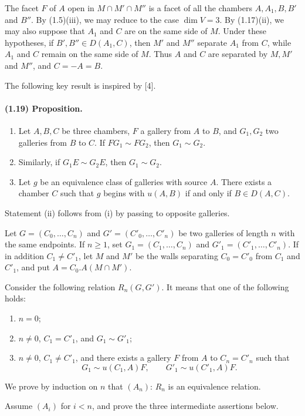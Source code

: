 \documentclass[10pt]{article}
\begin{document}
The facet $F$ of $A$ open in $M\cap M'\cap M''$ is a facet of all the chambers $A,A_1,B,B'$ and $B''$. By (1.5)(iii), we may reduce to the case $\dim V=3$. By (1.17)(ii), we may also suppose that $A_1$ and $C$ are on the same side of $M$. Under these hypotheses, if $B',B''\in D(A_1,C)$, then $M'$ and $M''$ separate $A_1$ from $C$, while $A_1$ and $C$ remain on the same side of $M$. Thus $A$ and $C$ are separated by $M,M'$ and $M''$, and $C=-A=B$.

The following key result is inspired by [4].

\paragraph{(1.19) Proposition.} \begin{enumerate}[label=(\roman*)]
\item Let $A,B,C$ be three chambers, $F$ a gallery from $A$ to $B$, and $G_1,G_2$ two galleries from $B$ to $C$. If $FG_1\sim FG_2$, then $G_1\sim G_2$.
\item Similarly, if $G_1E\sim G_2E$, then $G_1\sim G_2$.
\item Let $g$ be an equivalence class of galleries with source $A$. There exists a chamber $C$ such that $g$ begins with $u(A,B)$ if and only if $B\in D(A,C)$.
\end{enumerate}
Statement (ii) follows from (i) by passing to opposite galleries.

Let $G=(C_0,\ldots,C_n)$ and $G'=(C'_0,\ldots,C'_n)$ be two galleries of length $n$ with the same endpoints. If $n\ge1$, set $G_1=(C_1,\ldots,C_n)$ and $G'_1=(C'_1,\ldots,C'_n)$. If in addition $C_1\ne C'_1$, let $M$ and $M'$ be the walls separating $C_0=C'_0$ from $C_1$ and $C'_1$, and put $A=C_0.A(M\cap M')$.

Consider the following relation $R_n(G,G')$. It means that one of the following holds:
\begin{enumerate}[label=\alph*)]
\item $n=0$;
\item $n\ne0$, $C_1=C'_1$, and $G_1\sim G'_1$;
\item $n\ne0$, $C_1\ne C'_1$, and there exists a gallery $F$ from $A$ to $C_n=C'_n$ such that
\[
G_1\sim u(C_1,A)F,\qquad G'_1\sim u(C'_1,A)F.
\]
\end{enumerate}
We prove by induction on $n$ that $(A_n)$: $R_n$ is an equivalence relation.

Assume $(A_i)$ for $i<n$, and prove the three intermediate assertions below.
\end{document}
